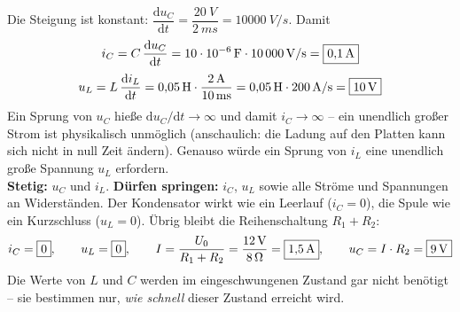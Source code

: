 \documentclass[11pt,a4paper]{article}
\begin{document}
\begin{loesung}
Die Steigung ist konstant: $\dfrac{\mathrm{d}u_C}{\mathrm{d}t} = \dfrac{\SI{20}{V}}{\SI{2}{ms}} = \SI{10000}{V/s}$. Damit
\[
  i_C = C\,\frac{\mathrm{d}u_C}{\mathrm{d}t} = \SI{10e-6}{F}\cdot\SI{10000}{V/s} = \boxed{\SI{0.1}{A}}
\]
\[
  u_L = L\,\frac{\mathrm{d}i_L}{\mathrm{d}t} = \SI{0.05}{H}\cdot\frac{\SI{2}{A}}{\SI{10}{ms}} = \SI{0.05}{H}\cdot\SI{200}{A/s} = \boxed{\SI{10}{V}}
\]
Ein Sprung von $u_C$ hieße $\mathrm{d}u_C/\mathrm{d}t \to \infty$ und damit $i_C \to \infty$ -- ein unendlich großer Strom ist physikalisch unmöglich (anschaulich: die Ladung auf den Platten kann sich nicht in null Zeit ändern). Genauso würde ein Sprung von $i_L$ eine unendlich große Spannung $u_L$ erfordern.\\
\textbf{Stetig:} $u_C$ und $i_L$. \quad \textbf{Dürfen springen:} $i_C$, $u_L$ sowie alle Ströme und Spannungen an Widerständen.
Der Kondensator wirkt wie ein Leerlauf ($i_C = 0$), die Spule wie ein Kurzschluss ($u_L = 0$). Übrig bleibt die Reihenschaltung $R_1 + R_2$:
\[
  i_C = \boxed{0}, \qquad u_L = \boxed{0}, \qquad
  I = \frac{U_0}{R_1+R_2} = \frac{\SI{12}{V}}{\SI{8}{\ohm}} = \boxed{\SI{1.5}{A}}, \qquad
  u_C = I\cdot R_2 = \boxed{\SI{9}{V}}
\]
Die Werte von $L$ und $C$ werden im eingeschwungenen Zustand gar nicht benötigt -- sie bestimmen nur, \emph{wie schnell} dieser Zustand erreicht wird.
\end{loesung}
\end{document}

